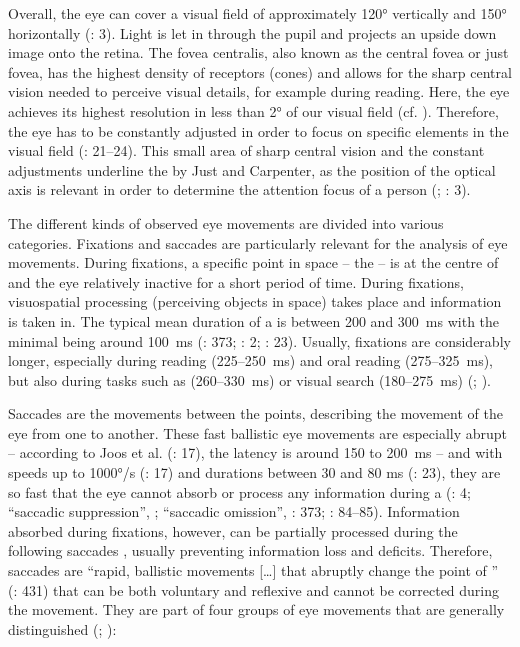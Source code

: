 Overall, the eye can cover a visual field of approximately 120° vertically and 150° horizontally (\citealt{Flothow2009}: 3). Light is let in through the pupil and projects an upside down image onto the retina. The fovea centralis, also known as the central fovea or just fovea, has the highest density of receptors (cones) and allows for the sharp central vision needed to perceive visual details, for example during reading. Here, the eye achieves its highest resolution in less than 2° of our visual field (cf. \citealt{Kruger????}). Therefore, the eye has to be constantly adjusted in order to focus on specific elements in the visual field (\citealt{Holmqvist2011}: 21--24). This small area of sharp central vision and the constant adjustments underline the  by Just and Carpenter, as the position of the optical axis is relevant in order to determine the attention focus of a person (\citealt{Just1980}; \citealt{Flothow2009}: 3).

The different kinds of observed eye movements are divided into various categories. Fixations and saccades are particularly relevant for the analysis of eye movements. During fixations, a specific point in space – the  – is at the centre of  and the eye relatively inactive for a short period of time. During fixations, visuospatial processing (perceiving objects in space) takes place and information is taken in. The typical mean duration of a  is between 200 and 300~ms with the minimal  being around 100~ms (\citealt{rayner1998}: 373; \citealt{Flothow2009}: 2; \citealt{Holmqvist2011}: 23). Usually, fixations are considerably longer, especially during reading (225--250~ms) and oral reading (275--325~ms), but also during tasks such as  (260--330~ms) or visual search (180--275~ms) (\citealt{rayner1998}; \citealt{Jakobsen2008}).

Saccades are the movements between the  points, describing the movement of the eye from one  to another. These fast ballistic eye movements are especially abrupt – according to Joos et al. (\citeyear{Joos-Roetting-Velich2003}: 17), the latency is around 150 to 200~ms – and with speeds up to 1000°/s (\citeyear{Joos-Roetting-Velich2003}: 17) and durations between 30 and 80 ms (\citealt{Holmqvist2011}: 23), they are so fast that the eye cannot absorb or process any information during a  (\citealt{Flothow2009}: 4; “saccadic suppression”, \citealt{Volkmann1978}; “saccadic omission”, \citealt{Chekaluk1994}: 373; \citealt{schotter2012}: 84--85). Information absorbed during fixations, however, can be partially processed during the following saccades \citep{Holmqvist2011}, usually preventing information loss and deficits. Therefore, saccades are “rapid, ballistic movements […] that abruptly change the point of ” (\citealt{purves2001}: 431) that can be both voluntary and reflexive and cannot be corrected during the movement. They are part of four groups of eye movements that are generally distinguished (\citealt{purves2001}; \citealt{Joos-Helmert2005}):

